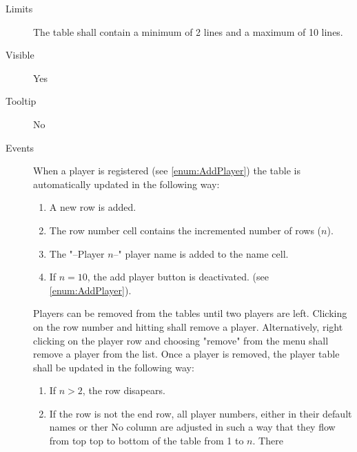 \begin{enumerate}
\begin{description}
                  \item[Limits] The table shall contain a minimum of 2 lines
                                and a maximum of 10 lines.
                  \item[Visible] Yes
                  \item[Tooltip] No
                  \item[Events] When a player is registered (see \cref{enum:AddPlayer})
                                the table is automatically updated in the following
                                way:
                                \begin{enumerate}
                                    \item A new row is added.
                                    \item The row number cell contains the incremented
                                          number of rows ($n$).
                                    \item The "--Player $n$--" player name is added to the
                                          name cell.
                                    \item If $n = 10$, the add player button is deactivated.
                                          (see \cref{enum:AddPlayer}).
                                \end{enumerate}
                                Players can be removed from the tables until two players
                                are left. Clicking on the row number and hitting \Del
                                shall remove a player. Alternatively, right clicking
                                on the player row and choosing "remove" from the menu
                                shall remove a player from the list. Once a player is
                                removed, the player table shall be updated in the following
                                way:
                                \begin{enumerate}
                                    \item If $n > 2$, the row disapears.
                                    \item If the row is not the end row, all player numbers,
                                          either in their default names or ther No column
                                          are adjusted in such a way that they flow from top
                                          top to bottom of the table from 1 to $n$. There

\end{enumerate}
\end{description}
\end{enumerate}
